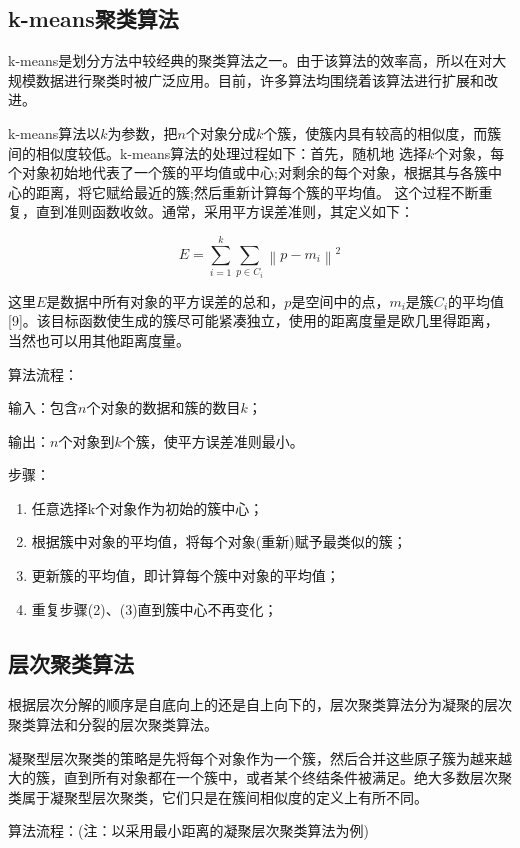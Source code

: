 \subsection{k-means聚类算法}

k-means是划分方法中较经典的聚类算法之一。由于该算法的效率高，所以在对大规模数据进行聚类时被广泛应用。目前，许多算法均围绕着该算法进行扩展和改进。

k-means算法以$k$为参数，把$n$个对象分成$k$个簇，使簇内具有较高的相似度，而簇间的相似度较低。k-means算法的处理过程如下：首先，随机地 选择$k$个对象，每个对象初始地代表了一个簇的平均值或中心;对剩余的每个对象，根据其与各簇中心的距离，将它赋给最近的簇;然后重新计算每个簇的平均值。 这个过程不断重复，直到准则函数收敛。通常，采用平方误差准则，其定义如下：

$$
E=\sum_{i=1}^{k}\sum_{p\in C_i}\left\|p-m_i\right\|^2
$$

这里$E$是数据中所有对象的平方误差的总和，$p$是空间中的点，$m_i$是簇$C_i$的平均值[9]。该目标函数使生成的簇尽可能紧凑独立，使用的距离度量是欧几里得距离，当然也可以用其他距离度量。

算法流程：

输入：包含$n$个对象的数据和簇的数目$k$；

输出：$n$个对象到$k$个簇，使平方误差准则最小。

步骤：

\begin{enumerate}\itemsep0em 
		\item 任意选择k个对象作为初始的簇中心；
		\item 根据簇中对象的平均值，将每个对象(重新)赋予最类似的簇；
		\item 更新簇的平均值，即计算每个簇中对象的平均值；
		\item 重复步骤(2)、(3)直到簇中心不再变化；
\end{enumerate}

\subsection{层次聚类算法}


根据层次分解的顺序是自底向上的还是自上向下的，层次聚类算法分为凝聚的层次聚类算法和分裂的层次聚类算法。

凝聚型层次聚类的策略是先将每个对象作为一个簇，然后合并这些原子簇为越来越大的簇，直到所有对象都在一个簇中，或者某个终结条件被满足。绝大多数层次聚类属于凝聚型层次聚类，它们只是在簇间相似度的定义上有所不同。


算法流程：(注：以采用最小距离的凝聚层次聚类算法为例)

